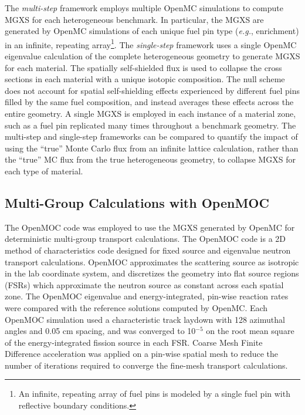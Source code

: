 The \textit{multi-step} framework employs multiple OpenMC simulations to compute MGXS for each heterogeneous benchmark. In particular, the MGXS are generated by OpenMC simulations of each unique fuel pin type (\textit{e.g.}, enrichment) in an infinite, repeating array\footnote{An infinite, repeating array of fuel pins is modeled by a single fuel pin with reflective boundary conditions.}. The \textit{single-step} framework uses a single OpenMC eigenvalue calculation of the complete heterogeneous geometry to generate MGXS for each material. The spatially self-shielded flux is used to collapse the cross sections in each material with a unique isotopic composition. The null scheme does not account for spatial self-shielding effects experienced by different fuel pins filled by the same fuel composition, and instead averages these effects across the entire geometry. A single MGXS is employed in each instance of a material zone, such as a fuel pin replicated many times throughout a benchmark geometry. The multi-step and single-step frameworks can be compared to quantify the impact of using the ``true'' Monte Carlo flux from an infinite lattice calculation, rather than the ``true'' MC flux from the true heterogeneous geometry, to collapse MGXS for each type of material. 


\subsection{Multi-Group Calculations with OpenMOC}
\label{subsec:openmoc}

The OpenMOC code \cite{boyd2014openmoc} was employed to use the MGXS generated by OpenMC for deterministic multi-group transport calculations. The OpenMOC code is a 2D method of characteristics code designed for fixed source and eigenvalue neutron transport calculations. OpenMOC approximates the scattering source as isotropic in the lab coordinate system, and discretizes the geometry into flat source regions (FSRs) which approximate the neutron source as constant across each spatial zone. The OpenMOC eigenvalue and energy-integrated, pin-wise reaction rates were compared with the reference solutions computed by OpenMC. Each OpenMOC simulation used a characteristic track laydown with 128 azimuthal angles and 0.05 cm spacing, and was converged to 10$^{-5}$ on the root mean square of the energy-integrated fission source in each FSR. Coarse Mesh Finite Difference acceleration was applied on a pin-wise spatial mesh to reduce the number of iterations required to converge the fine-mesh transport calculations.


